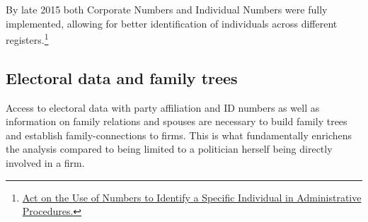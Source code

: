 By late 2015 both Corporate Numbers and Individual Numbers were fully implemented, allowing for better identification of individuals across different registers.\footnote{\href{http://www.japaneselawtranslation.go.jp/law/detail/?id=2755&vm=04&re=02}{Act on the Use of Numbers to Identify a Specific Individual in Administrative Procedures.}}

\subsection{Electoral data and family trees}
Access to electoral data with party affiliation and ID numbers as well as information on family relations and spouses are necessary to build family trees and establish family-connections to firms. This is what fundamentally enrichens the analysis compared to being limited to a politician herself being directly involved in a firm.
